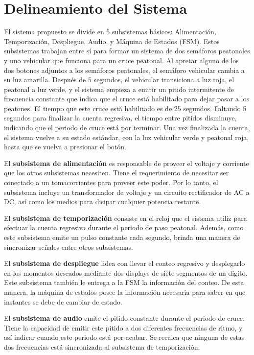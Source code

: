 \documentclass[12pt,onecolumn]{IEEEtran}
\begin{document}
\section{Delineamiento del Sistema}

El sistema propuesto se divide en 5 subsistemas básicos: Alimentación, Temporización, Despliegue, Audio, y Máquina de Estados (FSM). Estos subsistemas trabajan entre sí para formar un sistema de dos semáforos peatonales y uno vehicular que funciona para un cruce peatonal. Al apretar alguno de los dos botones adjuntos a los semáforos peatonales, el semáforo vehicular cambia a su luz amarilla. Después de 5 segundos, el vehicular transiciona a luz roja, el peatonal a luz verde, y el sistema empieza a emitir un pitido intermitente de frecuencia constante que indica que el cruce está habilitado para dejar pasar a los peatones. El tiempo que este cruce está habilitado es de 25 segundos. Faltando 5 segundos para finalizar la cuenta regresiva, el tiempo entre pitidos disminuye, indicando que el periodo de cruce está por terminar. Una vez finalizada la cuenta, el sistema vuelve a su estado estándar, con la luz vehicular verde y peatonal roja, hasta que se vuelva a presionar el botón.

El \textbf{subsistema de alimentación} es responsable de proveer el voltaje y corriente que los otros subsistemas necesiten. Tiene el requerimiento de necesitar ser conectado a un tomacorrientes para proveer este poder. Por lo tanto, el subsistema incluye un transformador de voltaje y un circuito rectificador de AC a DC, así como los medios para disipar cualquier potencia restante.

El \textbf{subsistema de temporización} consiste en el reloj que el sistema utiliz para efectuar la cuenta regresiva durante el periodo de paso peatonal. Además, como este subsistema emite un pulso constante cada segundo, brinda una manera de sincronizar señales entre otros subsistemas.

El \textbf{subsistema de despliegue} lidea con llevar el conteo regresivo y desplegarlo en los momentos deseados mediante dos displays de siete segmentos de un dígito. Este subsistema también le entrega a la FSM la información del conteo. De esta manera, la máquina de estados posee la información necesaria para saber en que instantes se debe de cambiar de estado.

El \textbf{subsistema de audio} emite el pitido constante durante el periodo de cruce. Tiene la capacidad de emitir este pitido a dos diferentes frecuencias de ritmo, y así indicar cuando este periodo está por acabar. Se recalca que ninguna de estas dos frecuencias está sincronizada al subsistema de temporización.
\end{document}
